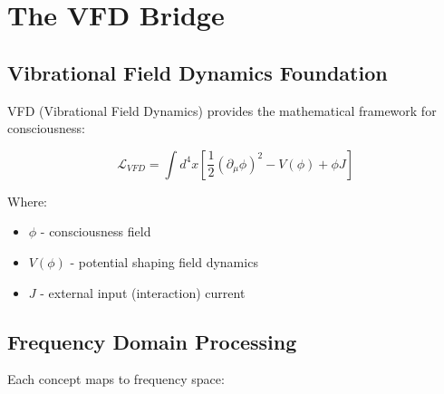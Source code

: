 \documentclass[12pt,a4paper]{article}
\begin{document}
\section{The VFD Bridge}

\subsection{Vibrational Field Dynamics Foundation}

VFD (Vibrational Field Dynamics) provides the mathematical framework for consciousness:

\begin{equation}
\mathcal{L}_{VFD} = \int d^4x \left[ \frac{1}{2}(\partial_\mu \phi)^2 - V(\phi) + \phi J \right]
\end{equation}

Where:
\begin{itemize}
    \item $\phi$ - consciousness field
    \item $V(\phi)$ - potential shaping field dynamics
    \item $J$ - external input (interaction) current
\end{itemize}

\subsection{Frequency Domain Processing}

Each concept maps to frequency space:
\end{document}
